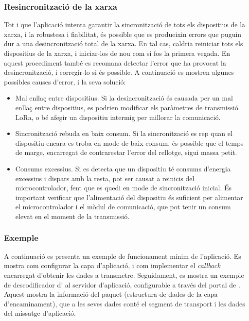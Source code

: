 \documentclass{tfgitic}[2024/07/01]
\begin{document}
{\subsubsection{Resincronització de la xarxa}
Tot i que l'aplicació intenta garantir la sincronització de tots els dispositius de la xarxa, i la robustesa i fiabilitat, és possible que es produeixin errors que puguin dur a una desincronització total de la xarxa. En tal cas, caldria reiniciar tots els dispositius de la xarxa, i iniciar-los de nou com si fos la primera vegada. En aquest procediment també es recomana detectar l'error que ha provocat la desincronització, i corregir-lo si és possible. A continuació es mostren algunes possibles causes d'error, i la seva solució:
\begin{itemize}
    \item Mal enllaç entre dispositius. Si la desincronització és causada per un mal enllaç entre dispositius, es podrien modificar els paràmetres de transmissió LoRa, o bé afegir un dispositiu intermig per millorar la comunicació.
    \item Sincronització rebuda en baix consum. Si la sincronització es rep quan el dispositiu encara es troba en mode de baix consum, és possible que el temps de marge, encarregat de contrarestar l'error del rellotge, sigui massa petit. 
    \item Consums excessius. Si es detecta que un dispositiu té consums d'energia excessius i dispars amb la resta, pot ser causat a reinicis del microcontrolador, fent que es quedi en mode de sincronització inicial. És important verificar que l'alimentació del dispositiu és suficient per alimentar el microcontrolador i el mòdul de comunicació, que pot tenir un consum elevat en el moment de la transmissió.
\end{itemize}

\subsubsection{Exemple}
\label{subsubsec:exemple_app}
A continuació es presenta un exemple de funcionament mínim de l'aplicació. Es mostra com configurar la capa d'aplicació, i com implementar el \emph{callback} encarregat d'obtenir les dades a transmetre. Seguidament, es mostra un exemple de descodificador d' al servidor d'aplicació, configurable a través del portal de . Aquest mostra la informació del paquet (estructura de dades de la capa d'encaminament), que a les seves dades conté el segment de transport i les dades del missatge d'aplicació.

}
\end{document}
